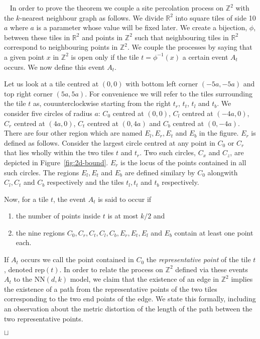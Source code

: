 \documentclass[11pt]{article}
\newcommand{\sq}{\hbox{\rlap{$\sqcap$}$\sqcup$}}
\newcommand{\qed}{\hspace*{\fill}\sq}
\newenvironment{proof}{\noindent {\bf Proof.}\ }{\qed\par\vskip 4mm\par}
\def\rep{\mbox{rep}}
\def\RR{\mathbb{R}}
\def\ZZ{\mathbb{Z}}
\def\NN{\mbox{NN}}
\begin{document}
\begin{proof} In order to prove the theorem we couple a site
percolation process on $\ZZ^2$ with the $k$-nearest neighbour graph as
follows. We divide $\RR^2$ into square tiles of side 10$a$ where $a$
is a parameter whose value will be fixed later. We create a bijection,
$\phi$, between these tiles in $\RR^2$ and points in $\ZZ^2$ such that
neighbouring tiles in $\RR^2$ correspond to neighbouring points in
$\ZZ^2$. We couple the processes by saying that a given point $x$ in
$\ZZ^2$ is open only if the tile $t = \phi^{-1}(x)$ a certain event
$A_t$ occurs. We now define this event $A_t$.

Let us look at a tile centred at $(0,0)$ with bottom left corner
$(-5a,-5a)$ and top right corner $(5a,5a)$. For convenience we will
refer to the tiles surrounding the tile $t$ as, couunterclockwise
starting from the right $t_r$, $t_t$, $t_l$ and $t_b$. We consider
five circles of radius $a$: $C_0$ centred at $(0,0)$, $C_l$ centred at
$(-4a,0)$, $C_r$ centred at $(4a,0)$, $C_t$ centred at $(0,4a)$ and
$C_b$ centred at $(0,-4a)$. There are four other region which are
named $E_l, E_r, E_t$ and $E_b$ in the figure. $E_r$ is defined as
follows. Consider the largest circle centred at any point in $C_0$ or
$C_r$ that lies wholly within the two tiles $t$ and $t_r$. Two such
circles, $C_x$ and $C_z$, are depicted in
Figure~\ref{fig:2d-bound}. $E_r$ is the locus of the points contained
in all such circles. The regions $E_l, E_t$ and $E_b$ are defined
similary by $C_0$ alongwith $C_l, C_t$ and $C_b$ respectively and the
tiles $t_l, t_t$ and $t_b$ respectively. 

Now, for a tile $t$, the event $A_t$ is said to occur if
\begin{enumerate}
\item the number of points inside $t$ is at most $k/2$ and 
\item the nine regions $C_0, C_r, C_t, C_l, C_b, E_r, E_t, E_l$ and
  $E_b$ contain at least one point each.
\end{enumerate}

If $A_t$ occurs we call the point contained in $C_0$ the {\em
representative point} of the tile $t$, denoted $\rep(t)$. In order to
relate the process on $\ZZ^2$ defined via these events $A_t$ to the
$\NN(d,k)$ model, we claim that the existence of an edge in $\ZZ^2$
implies the existence of a path from the representative points of the
two tiles corresponding to the two end points of the edge. We state
this formally, including an observation about the metric distortion of
the length of the path between the two representative points.


\end{proof}
\end{document}
